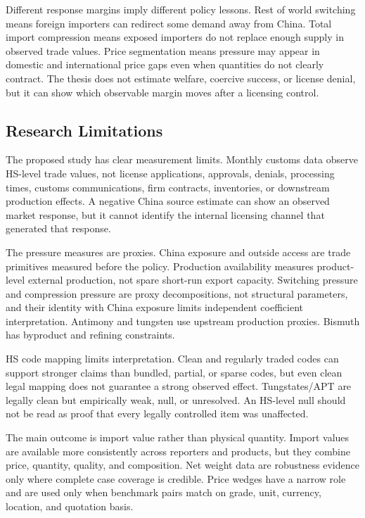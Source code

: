 \documentclass[12pt,a4paper]{article}
\numberwithin{equation}{section}
\begin{document}
Different response margins imply different policy lessons. Rest of world switching means foreign importers can redirect some demand away from China. Total import compression means exposed importers do not replace enough supply in observed trade values. Price segmentation means pressure may appear in domestic and international price gaps even when quantities do not clearly contract. The thesis does not estimate welfare, coercive success, or license denial, but it can show which observable margin moves after a licensing control.

\subsection{Research Limitations}

The proposed study has clear measurement limits. Monthly customs data observe HS-level trade values, not license applications, approvals, denials, processing times, customs communications, firm contracts, inventories, or downstream production effects. A negative China source estimate can show an observed market response, but it cannot identify the internal licensing channel that generated that response.

The pressure measures are proxies. China exposure and outside access are trade primitives measured before the policy. Production availability measures product-level external production, not spare short-run export capacity. Switching pressure and compression pressure are proxy decompositions, not structural parameters, and their identity with China exposure limits independent coefficient interpretation. Antimony and tungsten use upstream production proxies. Bismuth has byproduct and refining constraints.

HS code mapping limits interpretation. Clean and regularly traded codes can support stronger claims than bundled, partial, or sparse codes, but even clean legal mapping does not guarantee a strong observed effect. Tungstates/APT are legally clean but empirically weak, null, or unresolved. An HS-level null should not be read as proof that every legally controlled item was unaffected.

The main outcome is import value rather than physical quantity. Import values are available more consistently across reporters and products, but they combine price, quantity, quality, and composition. Net weight data are robustness evidence only where complete case coverage is credible. Price wedges have a narrow role and are used only when benchmark pairs match on grade, unit, currency, location, and quotation basis.
\end{document}
